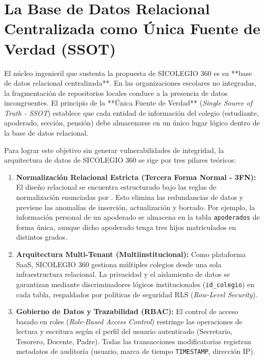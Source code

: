 \documentclass[12pt,a4paper,oneside]{report}
\begin{document}
    \section{La Base de Datos Relacional Centralizada como Única Fuente de Verdad (SSOT)}

    El núcleo ingenieril que sustenta la propuesta de SICOLEGIO 360 es su **base de datos relacional centralizada**. En las organizaciones escolares no integradas, la fragmentación de repositorios locales conduce a la presencia de datos incongruentes. El principio de la **Única Fuente de Verdad** (\textit{Single Source of Truth - SSOT}) establece que cada entidad de información del colegio (estudiante, apoderado, sección, pensión) debe almacenarse en un único lugar lógico dentro de la base de datos relacional.

    Para lograr este objetivo sin generar vulnerabilidades de integridad, la arquitectura de datos de SICOLEGIO 360 se rige por tres pilares teóricos:

    \begin{enumerate}
        \item \textbf{Normalización Relacional Estricta (Tercera Forma Normal - 3FN):} El diseño relacional se encuentra estructurado bajo las reglas de normalización enunciadas por \citet{date2004}. Esto elimina las redundancias de datos y previene las anomalías de inserción, actualización y borrado. Por ejemplo, la información personal de un apoderado se almacena en la tabla \texttt{apoderados} de forma única, aunque dicho apoderado tenga tres hijos matriculados en distintos grados.
        \item \textbf{Arquitectura Multi-Tenant (Multiinstitucional):} Como plataforma SaaS, SICOLEGIO 360 gestiona múltiples colegios desde una sola infraestructura relacional. La privacidad y el aislamiento de datos se garantizan mediante discriminadores lógicos institucionales (\texttt{id\_colegio}) en cada tabla, respaldados por políticas de seguridad RLS (\textit{Row-Level Security}).
        \item \textbf{Gobierno de Datos y Trazabilidad (RBAC):} El control de acceso basado en roles (\textit{Role-Based Access Control}) restringe las operaciones de lectura y escritura según el perfil del usuario autenticado (Secretario, Tesorero, Docente, Padre). Todas las transacciones modificatorias registran metadatos de auditoría (usuario, marca de tiempo \texttt{TIMESTAMP}, dirección IP).
    \end{enumerate}
\end{document}

